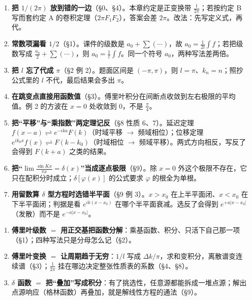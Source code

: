 \documentclass[11pt]{ctexart}
\begin{document}
\begin{enumerate}
\item \textbf{把 $1/(2\pi)$ 放到错的一边}（§0、§4）。本章约定是正变换带 $\frac{1}{2\pi}$；若按约定 B 写而套约定 A 的卷积定理（$2\pi F_1F_2$），答案会差 $2\pi$。改法：先写定义式，再代。

\item \textbf{常数项漏看 $1/2$}（§1）。课件的级数是 $a_0+\sum(\cdots)$，故 $a_0=\frac{1}{2l}\int f$；若把级数写成 $\frac{a_0}{2}+\sum(\cdots)$，则 $a_0=\frac{1}{l}\int f$。同一个符号 $a_0$，两种写法差两倍。

\item \textbf{把 $l$ 忘了代成 $\pi$}（§2 例 2）。题面区间是 $(-\pi,\pi)$，则 $l=\pi$、$k_n=n$；照抄公式里的 $l$ 不代，最后结果会多出 $\pi$。

\item \textbf{在跳变点直接用函数值}（§3）。傅里叶积分在间断点收敛到左右极限的平均值。例 2 的方波在 $x=0$ 处收敛到 $0$，不是 $\frac{\pi}{4}$。

\item \textbf{把“平移”与“乘指数”两定理记反}（§8 性质 6、7）。延迟定理 $f(x-a)\rightleftharpoons e^{-ika}F(k)$（时域平移 $\to$ 频域相位）；位移定理 $e^{ik_0x}f(x)\rightleftharpoons F(k-k_0)$（时域相位 $\to$ 频域平移）。两式方向相反，写反了会得到 $F(k+a)$ 之类的结果。

\item \textbf{把“$\lim\frac{\sin Kx}{\pi x}=\delta(x)$”当成逐点极限}（§9）。除 $x=0$ 外这个极限不存在，它只在配积分时成立；$\delta[\varphi(x)]$ 的公式要求 $\varphi$ 的根全为单根。

\item \textbf{用留数算 $\delta$ 型方程时选错半平面}（§9 例 3）。$x>x_0$ 在上半平面闭、$x<x_0$ 在下半平面闭；判据是看 $e^{ik(x-x_0)}$ 在哪个半平面衰减。选反了会得到 $e^{+a|x-x_0|}$（发散）而不是 $e^{-a|x-x_0|}$。
\end{enumerate}



\begin{enumerate}
\item \textbf{傅里叶级数 $=$ 用正交基把函数分解}：乘基函数、积分、只活下自己那一项（§1）；四种写法只是分母怎么记（§2）。
\item \textbf{傅里叶变换 $=$ 让周期趋于无穷}：$1/l$ 写成 $\Delta k/\pi$，求和变积分，离散谱变连续谱（§3）；$\frac{1}{2\pi}$ 挂在哪边决定整张性质表的系数（§4、§8）。
\item \textbf{$\delta$ 函数 $=$ 把“叠加”写成积分}：有了挑选性，任意源都能拆成一堆点源；解出点源响应（格林函数）再叠加，就是解线性方程的通法（§9）。
\end{enumerate}
\end{document}
